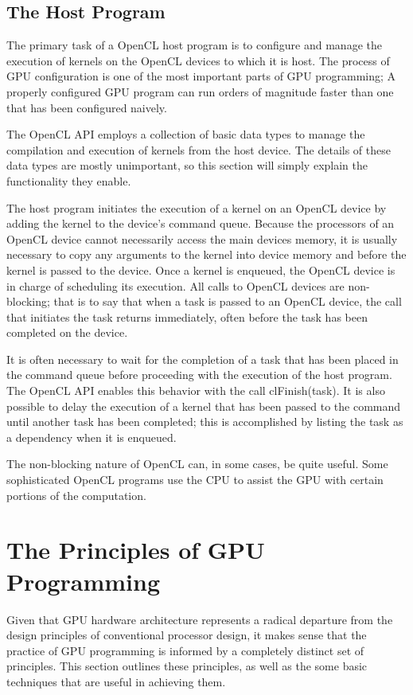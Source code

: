 \documentclass[12pt,twoside]{reedthesis}
\begin{document}
\subsection{The Host Program}

The primary task of a OpenCL host program is to configure and manage the execution of kernels on the OpenCL devices to which it is host. The process of GPU configuration is one of the most important parts of GPU programming; A properly configured GPU program can run orders of magnitude faster than one that has been configured naively.

The OpenCL API employs a collection of basic data types to manage the compilation and execution of kernels from the host device. The details of these data types are mostly unimportant, so this section will simply explain the functionality they enable.

The host program initiates the execution of a kernel on an OpenCL device by adding the kernel to the device's command queue. Because the processors of an OpenCL device cannot necessarily access the main devices memory, it is usually necessary to copy any arguments to the kernel into device memory and before the kernel is passed to the device. Once a kernel is enqueued, the OpenCL device is in charge of scheduling its execution. All calls to OpenCL devices are non-blocking; that is to say that when a task is passed to an OpenCL device, the call that initiates the task returns immediately, often before the task has been completed on the device. 

It is often necessary to wait for the completion of a task that has been placed in the command queue before proceeding with the execution of the host program. The OpenCL API enables this behavior with the call clFinish(task). It is also possible to delay the execution of a kernel that has been passed to the command until another task has been completed; this is accomplished by listing the task as a dependency when it is enqueued.

The non-blocking nature of OpenCL can, in some cases, be quite useful. Some sophisticated OpenCL programs use the CPU to assist the GPU with certain portions of the computation.


\section{The Principles of GPU Programming}

Given that GPU hardware architecture represents a radical departure from the design principles of conventional processor design, it makes sense that the practice of GPU programming is informed by a completely distinct set of principles. This section outlines these principles, as well as the some basic techniques that are useful in achieving them.
\end{document}
